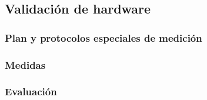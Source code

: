 



  \subsection{Validación de hardware}  

  \newpage




  \subsubsection{Plan y protocolos especiales de medición}  

  \newpage





  \subsubsection{Medidas}  

  \newpage




  \subsubsection{Evaluación}  

  \newpage





